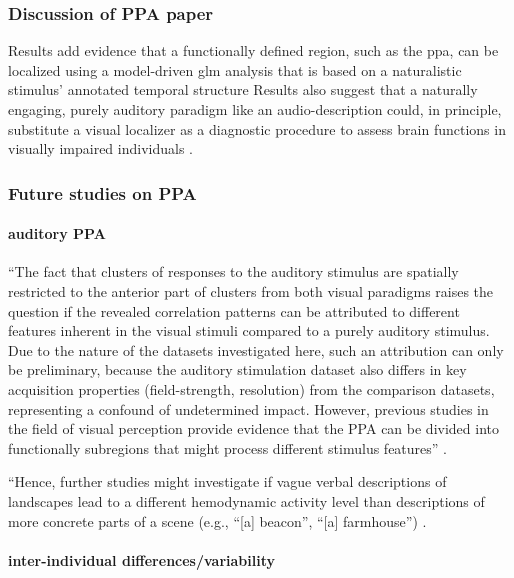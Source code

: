 \subsubsection{Discussion of PPA paper}
Results add evidence \citep[cf.][]{bartels2004mapping} that a functionally
defined region, such as the \ac{ppa}, can be localized using a model-driven
\ac{glm} analysis that is based on a naturalistic stimulus' annotated temporal
structure
Results also suggest that a naturally engaging, purely auditory paradigm like an
audio-description could, in principle, substitute a visual localizer as a
diagnostic procedure to assess brain functions in visually impaired individuals
\citep{haeusler2022processing}.




\subsubsection{Future studies on PPA}

\paragraph{auditory PPA}

``The fact that clusters of responses to the auditory stimulus are spatially
restricted to the anterior part of clusters from both visual paradigms raises
the question if the revealed correlation patterns can be attributed to different
features inherent in the visual stimuli compared to a purely auditory stimulus.
Due to the nature of the datasets investigated here, such an attribution can
only be preliminary, because the auditory stimulation dataset also differs in
key acquisition properties (field-strength, resolution) from the comparison
datasets, representing a confound of undetermined impact. However, previous
studies in the field of visual perception provide evidence that the PPA can be
divided into functionally subregions that might process different stimulus
features'' \citep{haeusler2022processing}.

``Hence, further studies might investigate if vague verbal descriptions of
landscapes lead to a different hemodynamic activity level than descriptions of
more concrete parts of a scene (e.g., ``[a] beacon'', ``[a] farmhouse'')
\citep{haeusler2022processing}.


\paragraph{inter-individual differences/variability}

